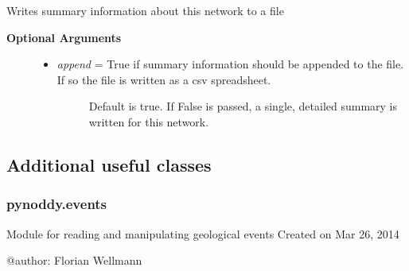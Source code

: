 \documentclass[a4paper,10pt,english]{sphinxmanual}
\begin{document}
\begin{fulllineitems}
\begin{fulllineitems}
\label{pynoddy:pynoddy.output.NoddyTopology.read_properties}
\end{fulllineitems}


\begin{fulllineitems}
\label{pynoddy:pynoddy.output.NoddyTopology.write_summary_file}
Writes summary information about this network to a file
\begin{description}
\item[{\textbf{Optional Arguments}}] \leavevmode\begin{itemize}
\item {} \begin{description}
\item[{\emph{append} = True if summary information should be appended to the file. If so the file is written as a csv spreadsheet. }] \leavevmode
Default is true. If False is passed, a single, detailed summary is written for this network.

\end{description}

\end{itemize}

\end{description}

\end{fulllineitems}


\end{fulllineitems}



\subsection{Additional useful classes}
\label{pynoddy:additional-useful-classes}

\subsubsection{pynoddy.events}
\label{pynoddy:pynoddy-events}\label{pynoddy:module-pynoddy.events}
Module for reading and manipulating geological events
Created on Mar 26, 2014

@author: Florian Wellmann
\end{document}
